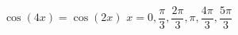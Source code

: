 { $\cos(4x) = \cos(2x)$}
{ $x = 0, \dfrac{\pi}{3}, \dfrac{2\pi}{3}, \pi, \dfrac{4\pi}{3}, \dfrac{5\pi}{3}$}
